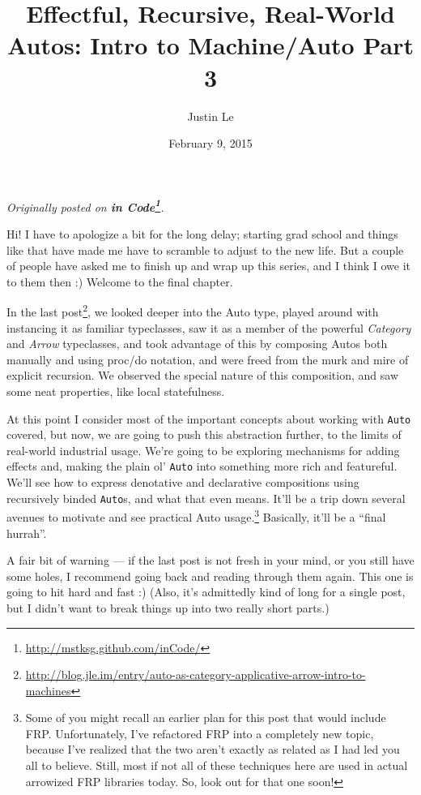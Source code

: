 \documentclass[]{article}
\title{Effectful, Recursive, Real-World Autos: Intro to Machine/Auto Part 3}
\author{Justin Le}
\date{February 9, 2015}
\renewcommand{\href}[2]{#2\footnote{\url{#1}}}
\begin{document}
\maketitle

\emph{Originally posted on
\textbf{\href{http://mstksg.github.com/inCode/}{in Code}}.}

Hi! I have to apologize a bit for the long delay; starting grad school
and things like that have made me have to scramble to adjust to the new
life. But a couple of people have asked me to finish up and wrap up this
series, and I think I owe it to them then :) Welcome to the final
chapter.

In the
\href{http://blog.jle.im/entry/auto-as-category-applicative-arrow-intro-to-machines}{last
post}, we looked deeper into the Auto type, played around with
instancing it as familiar typeclasses, saw it as a member of the
powerful \emph{Category} and \emph{Arrow} typeclasses, and took
advantage of this by composing Autos both manually and using proc/do
notation, and were freed from the murk and mire of explicit recursion.
We observed the special nature of this composition, and saw some neat
properties, like local statefulness.

At this point I consider most of the important concepts about working
with \texttt{Auto} covered, but now, we are going to push this
abstraction further, to the limits of real-world industrial usage. We're
going to be exploring mechanisms for adding effects and, making the
plain ol' \texttt{Auto} into something more rich and featureful. We'll
see how to express denotative and declarative compositions using
recursively binded \texttt{Auto}s, and what that even means. It'll be a
trip down several avenues to motivate and see practical Auto
usage.\footnote{Some of you might recall an earlier plan for this post
  that would include FRP. Unfortunately, I've refactored FRP into a
  completely new topic, because I've realized that the two aren't
  exactly as related as I had led you all to believe. Still, most if not
  all of these techniques here are used in actual arrowized FRP
  libraries today. So, look out for that one soon!} Basically, it'll be
a ``final hurrah''.

A fair bit of warning --- if the last post is not fresh in your mind, or
you still have some holes, I recommend going back and reading through
them again. This one is going to hit hard and fast :) (Also, it's
admittedly kind of long for a single post, but I didn't want to break
things up into two really short parts.)
\end{document}
